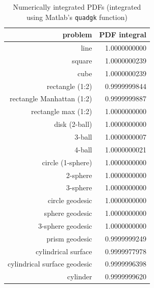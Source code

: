 \begin{table}[ht]
  \centering
  \begin{tabular}{r|r}
                  problem & PDF integral \\
     \hline 
                     line & 1.0000000000 \\
                   square & 1.0000000239 \\
                     cube & 1.0000000239 \\
          rectangle (1:2) & 0.9999999844 \\
rectangle Manhattan (1:2) & 0.9999999887 \\
      rectangle max (1:2) & 1.0000000000 \\
            disk (2-ball) & 1.0000000000 \\
                   3-ball & 1.0000000007 \\
                   4-ball & 1.0000000021 \\
        circle (1-sphere) & 1.0000000000 \\
                 2-sphere & 1.0000000000 \\
                 3-sphere & 1.0000000000 \\
          circle geodesic & 1.0000000000 \\
          sphere geodesic & 1.0000000000 \\
        3-sphere geodesic & 1.0000000000 \\
           prism geodesic & 0.9999999249 \\
      cylindrical surface & 0.9999977978 \\
cylindrical surface geodesic & 0.9999996398 \\
                 cylinder & 0.9999999620 \\
  \end{tabular}
  \caption{Numerically integrated PDFs (integrated using Matlab's {\tt quadgk} function)}
  \label{tab:numerical_pdf_sum}
\end{table}
